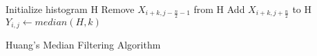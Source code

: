 \begin{algorithm}[H]
    \SetAlgoLined
    Initialize histogram H\;
    {
        {
            {
                Remove $X_{i+k,j-\frac{n}{2}-1}$  from H\;
                Add $X_{i+k,j+\frac{n}{2}}$ to H\; 
            }
            $Y_{i,j} \leftarrow median(H,k)$\;
        }
    }
\caption{Huang's Median Filtering Algorithm \cite{median_filter_old}}
\label{algorithm:median_filter}
\end{algorithm}